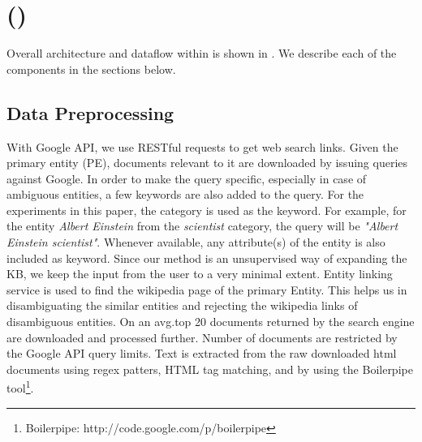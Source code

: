 
\section{\systemfull{} (\system{})}
\label{sec:method}

Overall architecture and dataflow within \system{} is shown in . We describe each of the components in the sections below.

\subsection{Data Preprocessing}
\label{sec:dataextraction}

With Google API, we use RESTful requests to get web search links. Given the primary entity (PE), documents relevant to it are downloaded by issuing queries against Google. In order to make the query specific, especially in case of ambiguous entities, 
a few keywords are also added to the query. For the experiments in this paper, the category is used as the keyword. For example, for the entity \textit{Albert Einstein} from the \textit{scientist}
category, the query will be \textit{"Albert Einstein scientist"}. 
Whenever available, any attribute(s) of the entity is also included as keyword. Since our method is an unsupervised way of expanding the KB, we keep the input from the user to a very minimal extent.   
Entity linking service is used to find the wikipedia page of the primary Entity. This helps us in disambiguating the similar entities and rejecting the wikipedia links of disambiguous entities.
On an avg.top 20 documents returned by the search engine are downloaded and processed further. Number of documents are restricted by the Google API query limits.
Text is extracted from the raw downloaded html documents using regex patters, HTML tag matching, and by using
the Boilerpipe tool\footnote{Boilerpipe: http://code.google.com/p/boilerpipe}.


